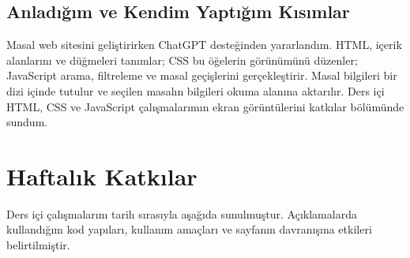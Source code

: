 \documentclass[12pt,a4paper]{article}
\begin{document}
\subsection{Anladığım ve Kendim Yaptığım Kısımlar}
Masal web sitesini geliştirirken ChatGPT desteğinden yararlandım. HTML, içerik alanlarını ve düğmeleri tanımlar; CSS bu öğelerin görünümünü düzenler; JavaScript arama, filtreleme ve masal geçişlerini gerçekleştirir. Masal bilgileri bir dizi içinde tutulur ve seçilen masalın bilgileri okuma alanına aktarılır. Ders içi HTML, CSS ve JavaScript çalışmalarımın ekran görüntülerini katkılar bölümünde sundum.

\section{Haftalık Katkılar}
Ders içi çalışmalarım tarih sırasıyla aşağıda sunulmuştur. Açıklamalarda kullandığım kod yapıları, kullanım amaçları ve sayfanın davranışına etkileri belirtilmiştir.
\end{document}

